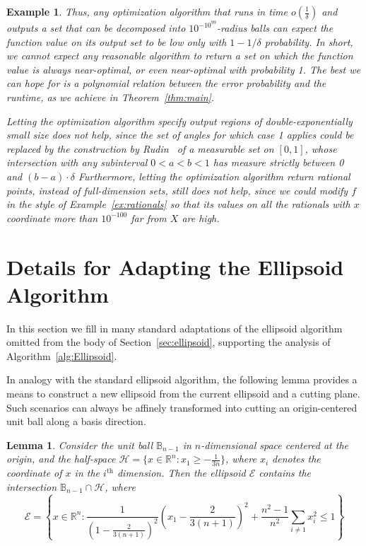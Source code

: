 \documentclass[11pt,letter]{article}
\newcommand{\Real}{\mathbb{R}}
\newcommand{\perr}{\delta}
\newcounter{nTheorems}
\numberwithin{nTheorems}{section}
\newtheorem{lemma}[nTheorems]{Lemma}
\newtheorem{example}[nTheorems]{Example}
\begin{document}
\begin{example}
Thus, any optimization algorithm that runs in time $o(\frac{1}{\perr})$ and outputs a set that can be decomposed into $10^{-10^{99}}$-radius balls can expect the function value on its output set to be low only with $1-1/\perr$ probability. In short, we cannot expect any reasonable algorithm to return a set on which the function value is always near-optimal, or even near-optimal with probability 1. The best we can hope for is a polynomial relation between the error probability and the runtime, as we achieve in Theorem~\ref{thm:main}.

Letting the optimization algorithm specify output regions of double-exponentially small size does not help, since the set of angles for which case 1 applies could be replaced by the construction by Rudin~\cite{Rudin:1983} of a measurable set on $[0,1]$, whose intersection with \emph{any} subinterval $0<a<b<1$ has measure strictly between 0 and $ (b-a)\cdot \perr$
Furthermore, letting the optimization algorithm return rational points, instead of full-dimension sets, still does not help, since we could modify $f$ in the style of Example~\ref{ex:rationals} so that its values on all the rationals with $x$ coordinate more than $10^{-100}$ far from $X$ are high.
\end{example}

\section{Details for Adapting the Ellipsoid Algorithm}\label{ap:ellipsoid}

In this section we fill in many standard adaptations of the ellipsoid algorithm omitted from the body of Section~\ref{sec:ellipsoid}, supporting the analysis of Algorithm~\ref{alg:Ellipsoid}.


In analogy with the standard ellipsoid algorithm, the following lemma provides a means to construct a new ellipsoid from the current ellipsoid and a cutting plane.
Such scenarios can always be affinely transformed into cutting an origin-centered unit ball along a basis direction.
\begin{lemma}
\label{lem:NewEllipsoid}
Consider the unit ball $\mathbb{B}_{n-1}$ in $n$-dimensional space centered at the origin, and the half-space $\mathcal{H} = \{x \in \Real^n : x_1 \ge -\frac{1}{3n}\}$, where $x_i$ denotes the coordinate of $x$ in the $i^\text{th}$ dimension.
Then the ellipsoid $\mathcal{E}$ contains the intersection $\mathbb{B}_{n-1} \cap \mathcal{H}$, where
$$ \mathcal{E} = \left\{ x \in \Real^n : \frac{1}{(1-\frac{2}{3(n+1)})^2} \left(x_1 - \frac{2}{3(n+1)}\right)^2 + \frac{n^2-1}{n^2}\sum_{i \neq 1} x_i^2 \le 1 \right\} $$
\end{lemma}
\end{document}
